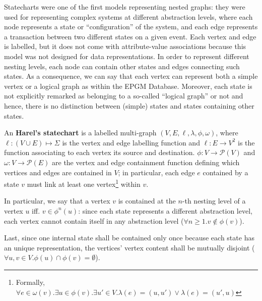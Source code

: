 Statecharts \cite{statecharts} were one of the first models representing nested graphs: they were used for representing complex systems at different abstraction levels, where each node represents a  state or ``configuration'' of the system, and each edge represents a transaction between two different states on a given event. Each vertex and edge is labelled, but  it does not come with attribute-value associations because this model was not designed for data representations. In order to represent different nesting levels, each node can contain other states and edges connecting such states. As a consequence, we can say that each vertex can represent both a simple vertex or a logical graph as within the EPGM Database. Moreover, each state is not explicitly remarked as belonging to a so-called ``logical graph'' or not and hence, there is no distinction between (simple) states and states containing other states.

\begin{definition}
An \textbf{Harel's statechart}  is a labelled multi-graph $(V,E,\ell,\lambda,\phi,\omega)$, where $\ell\colon(V\cup E)\mapsto \Sigma$ is the vertex and edge labelling function and $\ell\colon E\to V^2$ is the function associating to each vertex its source and destination. $\phi\colon V \to\mathcal{P}(V)$ and $\omega\colon V \to\mathcal{P}(E)$ are the vertex and edge containment function defining which vertices and edges are contained in $V$; in particular, each edge $e$ contained by a state $v$ must link at least one vertex\footnote{Formally, $\forall e\in \omega(v).\exists u\in \phi(v).\exists u'\in V. \lambda(e)=(u,u')\vee \lambda(e)=(u',u)$} within $v$.

In particular, we say that a vertex $v$ is contained at the $n$-th nesting level of a vertex $u$ iff. $v\in \phi^n(u)$: since each state represents a different abstraction level, each vertex cannot contain itself in any abstraction level ($\forall n\geq 1. v\notin \phi(v)$).

Last, since one internal state shall be contained only once because each state has an unique representation, the vertices' vertex content shall be mutually disjoint ($\forall u,v\in V. \phi(u)\cap \phi(v)=\emptyset$).
\end{definition} 

